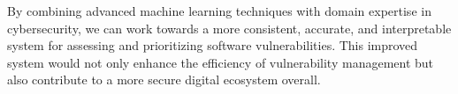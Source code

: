 \documentclass[12pt]{article}
\begin{document}
By combining advanced machine learning techniques with domain expertise in cybersecurity, we can
work towards a more consistent, accurate, and interpretable system for assessing and prioritizing
software vulnerabilities. This improved system would not only enhance the efficiency of
vulnerability management but also contribute to a more secure digital ecosystem overall.





\end{document}
